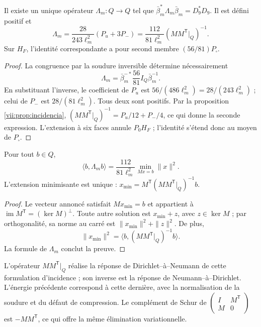\begin{theorem}
\label{vii:thm:respuesta-unica}
Il existe un unique opérateur \(\Lambda_m:Q\longrightarrow Q\) tel que
\(\bar\beta_m^*\Lambda_m\bar\beta_m=D_9^*D_9\). Il est défini positif et
\begin{equation}
 \Lambda_m=\frac{28}{243\ell_m^2}(P_u+3P_-)
 =\frac{112}{81\ell_m^2}
       (MM^{\mathsf T}|_Q)^{-1}.
 \label{vii:eq:lambda-pantalla}
\end{equation}
Sur \(H_F\), l'identité correspondante a pour second membre
\((56/81)P_\square\).
\end{theorem}

\begin{proof}
La congruence par la soudure inversible détermine nécessairement
\[
 \Lambda_m=\bar\beta_m^{-*}\frac{56}{81}I_Q\bar\beta_m^{-1}.
\]
En substituant l'inverse, le coefficient de \(P_u\) est \(56/(486\ell_m^2)=28/(243\ell_m^2)\) ; celui de \(P_-\) est \(28/(81\ell_m^2)\). Tous deux sont positifs. Par la proposition \ref{vii:prop:incidencia}, \((MM^{\mathsf T}|_Q)^{-1}=P_u/12+P_-/4\), ce qui donne la seconde expression. L'extension à six faces annule \(P_0H_F\) ; l'identité s'étend donc au moyen de \(P_\square\).
\end{proof}

\begin{proposition}
\label{vii:prop:minima-extension}
Pour tout \(b\in Q\),
\[
 \langle b,\Lambda_m b\rangle
 =\frac{112}{81\ell_m^2}
   \min_{Mx=b}\|x\|^2.
\]
L'extension minimisante est unique :
\(x_{\min}=M^{\mathsf T}(MM^{\mathsf T}|_Q)^{-1}b\).
\end{proposition}

\begin{proof}
Le vecteur annoncé satisfait \(Mx_{\min}=b\) et appartient à
\(\operatorname{im}M^{\mathsf T}=(\ker M)^\perp\).
Toute autre solution est \(x_{\min}+z\), avec \(z\in\ker M\) ; par
orthogonalité, sa norme au carré est \(\|x_{\min}\|^2+\|z\|^2\).
De plus,
\[
 \|x_{\min}\|^2
 =\langle b,(MM^{\mathsf T}|_Q)^{-1}b\rangle.
\]
La formule de \(\Lambda_m\) conclut la preuve.
\end{proof}

L'opérateur \(MM^{\mathsf T}|_Q\) réalise la réponse
de Dirichlet--à--Neumann de cette formulation d'incidence ; son inverse
est la réponse de Neumann--à--Dirichlet. L'énergie précédente correspond
à cette dernière, avec la normalisation de la soudure et du défaut de
compression. Le complément de Schur de
\(\left(\begin{smallmatrix}I&M^{\mathsf T}\\M&0\end{smallmatrix}\right)\)
est \(-MM^{\mathsf T}\), ce qui offre la même élimination variationnelle.

